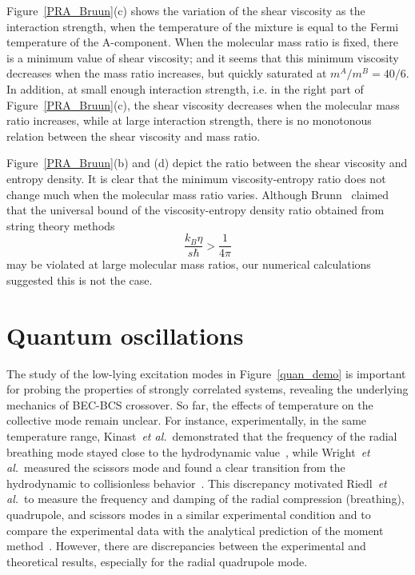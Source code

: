 Figure~\ref{PRA_Bruun}(c) shows the variation of the shear viscosity as the interaction strength, when the temperature of the mixture is equal to the Fermi temperature of the A-component. When the molecular mass ratio is fixed, there is a minimum value of shear viscosity; and it seems that this minimum viscosity decreases when the mass ratio increases, but quickly saturated at $m^A/m^B=40/6$. In addition, at small enough interaction strength, i.e. in the right part of Figure~\ref{PRA_Bruun}(c), the shear viscosity decreases when the molecular mass ratio increases, while at large interaction strength, there is no monotonous relation between the shear viscosity and mass ratio. 


Figure~\ref{PRA_Bruun}(b) and (d) depict the ratio between the shear viscosity and entropy density. It is clear that the minimum viscosity-entropy ratio does not change much when the molecular mass ratio varies. Although Brunn~\cite{bruun_2012} claimed that the universal bound of the viscosity-entropy density ratio obtained from string theory methods~\cite{viscosity_entropy}
\begin{equation*}%
\frac{k_B\eta}{s\hbar}>\frac{1}{4\pi}
\end{equation*} 
may be violated at large molecular mass ratios, our numerical calculations suggested this is not the case.



\section{Quantum oscillations}



The study of the low-lying excitation modes in  Figure~\ref{quan_demo} is important for probing the properties of strongly correlated systems, revealing the underlying mechanics of BEC-BCS crossover. So far, the effects of temperature on the collective mode remain unclear. For instance, experimentally, in the same temperature range, Kinast~\textit{et al.}~demonstrated  that the frequency of the radial breathing mode stayed close to the hydrodynamic value~\cite{Kinast2005}, while Wright~\textit{et al.}~measured the scissors mode and found a clear transition from the hydrodynamic to collisionless behavior~\cite{Wright2007}. This discrepancy motivated Riedl~\textit{et al.}~to measure the frequency and damping of the radial compression (breathing), quadrupole, and scissors modes in a similar experimental condition and to compare the experimental data with the analytical prediction of the moment method~\cite{Riedl2008}. However, there are discrepancies between the experimental and theoretical results, especially for the radial quadrupole mode.


